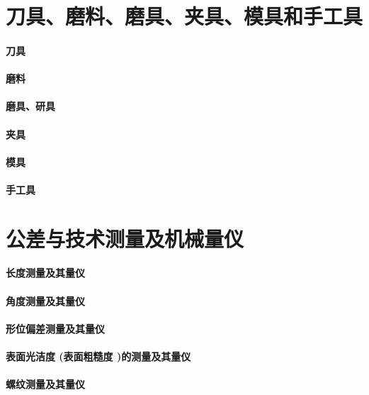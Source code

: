 \documentclass[UTF8]{../../ApplicationUniverse}
\begin{document}
\chapter{刀具、磨料、磨具、夹具、模具和手工具}
\subsubsection{刀具}
\subsubsection{磨料}
\subsubsection{磨具、研具}
\subsubsection{夹具}
\subsubsection{模具}
\subsubsection{手工具}








\chapter{公差与技术测量及机械量仪}
\subsubsection{长度测量及其量仪}
\subsubsection{角度测量及其量仪}
\subsubsection{形位偏差测量及其量仪}
\subsubsection{表面光洁度 (表面粗糙度 )的测量及其量仪}
\subsubsection{螺纹测量及其量仪}
\end{document}

